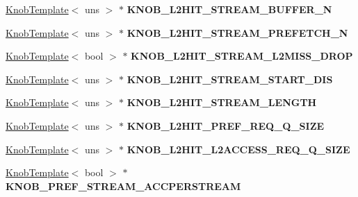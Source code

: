 \begin{DoxyCompactItemize}
\item 
\hypertarget{classall__knobs__c_a524810e4ec6a64f85b1827ea8779026f}{
\hyperlink{classKnobTemplate}{KnobTemplate}$<$ uns $>$ $\ast$ {\bfseries KNOB\_\-L2HIT\_\-STREAM\_\-BUFFER\_\-N}}
\label{classall__knobs__c_a524810e4ec6a64f85b1827ea8779026f}

\item 
\hypertarget{classall__knobs__c_aa9af8e4c098f1d66b76351b1747e0af3}{
\hyperlink{classKnobTemplate}{KnobTemplate}$<$ uns $>$ $\ast$ {\bfseries KNOB\_\-L2HIT\_\-STREAM\_\-PREFETCH\_\-N}}
\label{classall__knobs__c_aa9af8e4c098f1d66b76351b1747e0af3}

\item 
\hypertarget{classall__knobs__c_ae4b4a915390afac26ac158c515e937eb}{
\hyperlink{classKnobTemplate}{KnobTemplate}$<$ bool $>$ $\ast$ {\bfseries KNOB\_\-L2HIT\_\-STREAM\_\-L2MISS\_\-DROP}}
\label{classall__knobs__c_ae4b4a915390afac26ac158c515e937eb}

\item 
\hypertarget{classall__knobs__c_ad211aad4a77f6f8a874a1c1a49d1c95d}{
\hyperlink{classKnobTemplate}{KnobTemplate}$<$ uns $>$ $\ast$ {\bfseries KNOB\_\-L2HIT\_\-STREAM\_\-START\_\-DIS}}
\label{classall__knobs__c_ad211aad4a77f6f8a874a1c1a49d1c95d}

\item 
\hypertarget{classall__knobs__c_a8c931cbf71c8630326de1945c8d7ecbe}{
\hyperlink{classKnobTemplate}{KnobTemplate}$<$ uns $>$ $\ast$ {\bfseries KNOB\_\-L2HIT\_\-STREAM\_\-LENGTH}}
\label{classall__knobs__c_a8c931cbf71c8630326de1945c8d7ecbe}

\item 
\hypertarget{classall__knobs__c_afd0707099e2d5344bf0abe6e1519e203}{
\hyperlink{classKnobTemplate}{KnobTemplate}$<$ uns $>$ $\ast$ {\bfseries KNOB\_\-L2HIT\_\-PREF\_\-REQ\_\-Q\_\-SIZE}}
\label{classall__knobs__c_afd0707099e2d5344bf0abe6e1519e203}

\item 
\hypertarget{classall__knobs__c_aca7153ce84f211c6115c138f60d39693}{
\hyperlink{classKnobTemplate}{KnobTemplate}$<$ uns $>$ $\ast$ {\bfseries KNOB\_\-L2HIT\_\-L2ACCESS\_\-REQ\_\-Q\_\-SIZE}}
\label{classall__knobs__c_aca7153ce84f211c6115c138f60d39693}

\item 
\hypertarget{classall__knobs__c_a5439840a1a6941ccc40c053b653c82f6}{
\hyperlink{classKnobTemplate}{KnobTemplate}$<$ bool $>$ $\ast$ {\bfseries KNOB\_\-PREF\_\-STREAM\_\-ACCPERSTREAM}}
\label{classall__knobs__c_a5439840a1a6941ccc40c053b653c82f6}


\end{DoxyCompactItemize}
